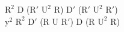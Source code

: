 $\text{R}^2$ D ($\text{R}'$ $\text{U}^2$ R) $\text{D}'$ ($\text{R}'$ $\text{U}^2$ $\text{R}'$)\\
$\text{y}^2$ $\text{R}^2$ $\text{D}'$ (R U $\text{R}'$) D (R $\text{U}^2$ R)\\
